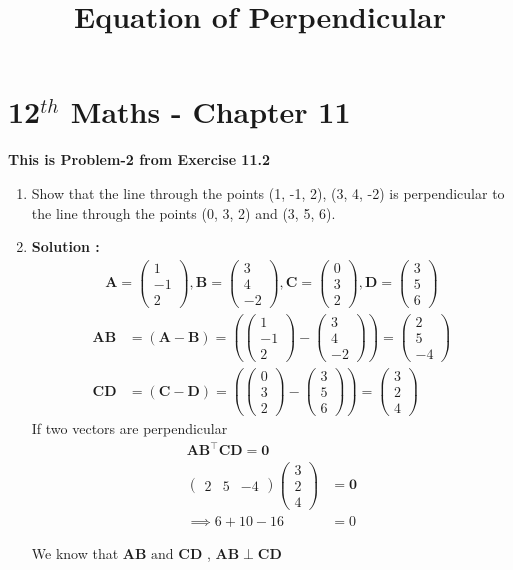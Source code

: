 \documentclass[12pt]{article}
\providecommand{\brak}[1]{\ensuremath{\left(#1\right)}}
\newcommand{\myvec}[1]{\ensuremath{\begin{pmatrix}#1\end{pmatrix}}}
\let\vec\mathbf
\begin{document}
\begin{center}
\title{\textbf{Equation  of Perpendicular}}
\date{\vspace{-5ex}} %
\maketitle
\end{center}
\setcounter{page}{1}
\section{12$^{th}$ Maths - Chapter 11}
\textbf{This is Problem-2 from Exercise 11.2}
\begin{enumerate}
\item Show that the line through the points (1, -1, 2), (3, 4, -2) is perpendicular to the line through the points (0, 3, 2) and (3, 5, 6).
\item \textbf{Solution :}
\begin{align}  
\vec{A}=\myvec{1 \\-1\\2},
\vec{B}=\myvec{3 \\ 4\\-2},
\vec{C}=\myvec{0 \\ 3\\2},
\vec{D}=\myvec{3 \\ 5\\6}
\end{align}
\begin{align}
\vec{AB} &=\brak{\vec{A}-\vec{B}} = \brak{\myvec{1 \\-1\\ 2 } - \myvec{3 \\4\\-2 } } = \myvec{2 \\ 5\\-4 }\\
\vec{CD} &= \brak{\vec{C}-\vec{D}} = \brak{\myvec{0 \\ 3\\2 } - \myvec{3 \\5\\6} } = \myvec{3\\2\\4}
\end{align}
 If two vectors are perpendicular
\begin{align}
\vec{AB}^\top\vec{CD}=\vec{0}\\
 \myvec{2 & 5& -4}\myvec{3 \\2\\4 } &= \vec{0}\\
 \implies 6+10-16&=0
\end{align}

We know that $\vec{AB} \text{ and } \vec{CD}$ , $\vec{AB}\perp \vec{CD}$ 


\end{enumerate} 
\end{document}

